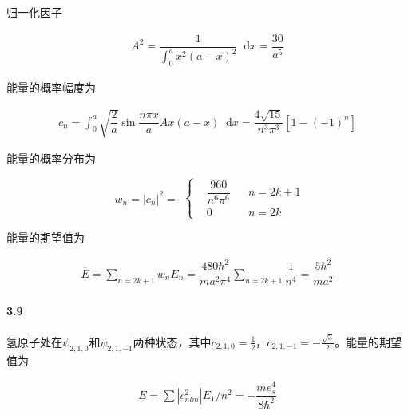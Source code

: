 \documentclass{article}
\newcommand*{\md}{\mathop{}\!\mathrm{d}}
\begin{document}
归一化因子

\begin{equation*}
  \begin{aligned}
    A^2 = \dfrac{1}{\int_0^a x^2 \left( a-x \right)^2} \md x = \dfrac{30}{a^5}  
  \end{aligned}
\end{equation*}

能量的概率幅度为

\begin{equation*}
  \begin{aligned}
    c_n = \int_0^a \sqrt{\dfrac{2}{a} } \sin \dfrac{n\pi x}{a} Ax \left( a-x \right) \md x
    = \dfrac{4 \sqrt{15}}{n^3 \pi^3} \left[ 1 - \left( -1 \right)^n \right] 
  \end{aligned}
\end{equation*}

能量的概率分布为

\begin{equation*}
  \begin{aligned}
    w_n = \left| c_n \right|^2 = 
  \end{aligned}
  \left\{
  \begin{aligned}
    & \dfrac{960}{n^6 \pi^6}&&n=2k+1 \\
    & 0 && n=2k
  \end{aligned}
  \right.
\end{equation*}

能量的期望值为

\begin{equation*}
  \begin{aligned}
    \overline{E} = \sum_{n=2k+1} w_n E_n 
    = \dfrac{480 \hbar^2}{m a^2 \pi^4} \sum_{n=2k+1} \dfrac{1}{n^4}  
    = \dfrac{5\hbar^2}{ma^2} 
  \end{aligned}
\end{equation*}

\paragraph{3.9}

氢原子处在$\psi_{2,1,0}$和$\psi_{2,1,-1}$两种状态，其中$c_{2,1,0}=\frac{1}{2} $，$c_{2,1,-1}=-\frac{\sqrt{3}}{2} $。能量的期望值为

\begin{equation*}
  \begin{aligned}
    E = \sum \left| c_{nlm}^2 \right| E_1 / n^2 = - \dfrac{m e_s^4}{8 \hbar^2}
  \end{aligned}
\end{equation*}
\end{document}
